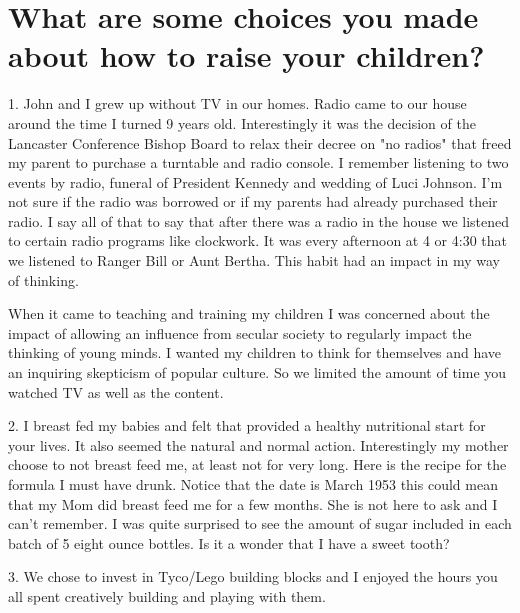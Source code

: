 \section{What are some choices you made about how to raise your children?}
    1. John and I grew up without TV in our homes. Radio came to our house around the time I turned 9 years old. Interestingly it was the decision of the Lancaster Conference Bishop Board to relax their decree on "no radios" that freed my parent to purchase a turntable and radio console. I remember listening to two events by radio, funeral of President Kennedy and wedding of Luci Johnson.  I'm not sure if the radio was borrowed or if my parents had already purchased their radio. I say all of that to say that after there was a radio in the house we listened to certain radio programs like clockwork. It was every afternoon at 4 or 4:30 that we listened to Ranger Bill or Aunt Bertha. This habit had an impact in my way of thinking. 

When it came to teaching and training my children I was concerned about the impact of     allowing an influence from secular society to regularly impact the thinking of young minds. I wanted my children to think for themselves and have an inquiring skepticism of popular culture. So we limited the amount of time you watched TV as well as the content.

    2. I breast fed my babies and felt that provided a healthy nutritional start for your lives. It also seemed the natural and normal action. Interestingly my mother choose to not breast feed me, at least not for very long. Here is the recipe for the formula I must have drunk. Notice that the date is March 1953 this could mean that my Mom did breast feed me for a few months. She is not here to ask and I can't remember. I was quite surprised to see the amount of sugar included in each batch of 5 eight ounce bottles. Is it a wonder that I have a sweet tooth?

    3. We chose to invest in Tyco/Lego building blocks and I enjoyed the hours you all spent creatively building and playing with them.





